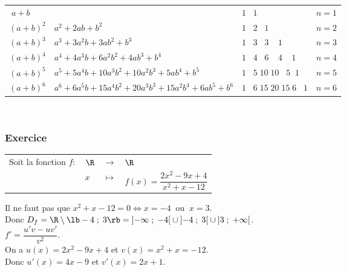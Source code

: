 \begin{tabular}{r@{$\;=\;$}lll}
\multicolumn{2}{l}{$ \; a+b$} & $1 \;\;\; 1$ & $n=1$ \\
$(a+b)^2 $ & $ a^2 +2ab+b^2$ & $1 \;\;\; 2 \;\;\; 1 $ & $n =2$ \\
$(a+b)^3 $ & $ a^3 +3a^2b+3ab^2+b^3$ & $1 \;\;\; 3 \;\;\; 3 \;\;\;\; 1 $ & $n =3$ \\
$(a+b)^4 $ & $ a^4 + 4a^3b +6a^2 b^2 + 4ab^3 +b^4 $
           &  $1 \;\;\; 4 \;\;\; 6 \;\;\;\; 4 \;\;\;\; 1 $ & $n =4$ \\
$(a+b)^5 $ & $ a^5 + 5a^4b +10a^3 b^2 + 10a^2b^3 + 5ab^4 + b^5 $
           &  $1 \;\;\; 5 \; 10 \; 10 \;\;\;  5 \;\; 1 $ & $n =5$ \\    
$(a+b)^6 $ & $ a^6 + 6a^5b +15a^4 b^2 + 20a^3b^3 + 15a^2b^4 + 6ab^5 +b^6 $
           &  $1 \;\;\; 6 \; 15 \; 20 \; 15 \;  6 \;\;\; 1 $ & $n =6$ \\                     
\end{tabular}\\

\newpage

\subsubsection{Exercice }

\begin{tabular}{llll}
Soit la fonction $f :$ & $\R$ & $\longrightarrow$ & $\R$ \\
& $x$ & $\longmapsto$ & $f(x) = \dfrac{2x^2 -9x +4}{x^2 + x - 12}$ \\
\end{tabular}

\vspace*{.3cm}

Il ne faut pas que $x^2 + x - 12 = 0 \Longleftrightarrow x = -4 \; \; \mathrm{ou} \; \;  x = 3$. \\

Donc $D_f = \R \setminus \lb -4 \; ; \; 3 \rb = \left]-\infty \; ; \; -4\right[\cup\left]-4\; ; \; 3\right[\cup\left]3\; ; \; +\infty\right[$. \\

$f' = \dfrac{u'v - uv'}{v^2}$. \\

On a $u(x) = 2x^2 - 9x + 4$ et $v(x) = x^2 + x = -12$. \\
Donc $u'(x) = 4x - 9$ et $v'(x) = 2x +1$. \\

